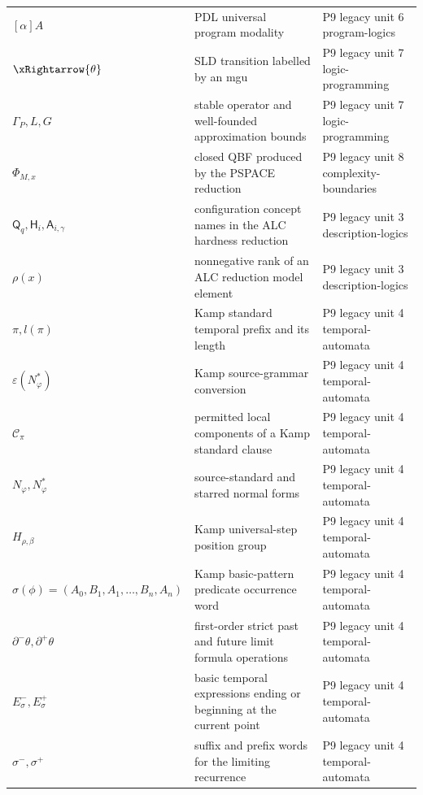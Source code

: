 \begin{longtable}{@{}p{}p{}p{}@{}}
\([\alpha]A\) & PDL universal program modality & P9 legacy unit 6 program-\allowbreak{}logics \\
\(\xRightarrow{\theta}\) & SLD transition labelled by an mgu & P9 legacy unit 7 logic-\allowbreak{}programming \\
\(\Gamma_P,\allowbreak L,\allowbreak G\) & stable operator and well-founded approximation bounds & P9 legacy unit 7 logic-\allowbreak{}programming \\
\(\Phi_{M,x}\) & closed QBF produced by the PSPACE reduction & P9 legacy unit 8 complexity-\allowbreak{}boundaries \\
\(\mathsf Q_q,\allowbreak \mathsf H_i,\allowbreak \mathsf A_{i,\gamma}\) & configuration concept names in the ALC hardness reduction & P9 legacy unit 3 description-\allowbreak{}logics \\
\(\rho(x)\) & nonnegative rank of an ALC reduction model element & P9 legacy unit 3 description-\allowbreak{}logics \\
\(\pi,\allowbreak l(\pi)\) & Kamp standard temporal prefix and its length & P9 legacy unit 4 temporal-\allowbreak{}automata \\
\(\varepsilon(N^*_{\varphi})\) & Kamp source-grammar conversion & P9 legacy unit 4 temporal-\allowbreak{}automata \\
\(\mathcal C_\pi\) & permitted local components of a Kamp standard clause & P9 legacy unit 4 temporal-\allowbreak{}automata \\
\(N_\varphi,\allowbreak N^*_{\varphi}\) & source-standard and starred normal forms & P9 legacy unit 4 temporal-\allowbreak{}automata \\
\(H_{\rho,\beta}\) & Kamp universal-step position group & P9 legacy unit 4 temporal-\allowbreak{}automata \\
\(\sigma(\phi)=(A_0,\allowbreak B_1,\allowbreak A_1,\allowbreak \ldots,\allowbreak B_n,\allowbreak A_n)\) & Kamp basic-pattern predicate occurrence word & P9 legacy unit 4 temporal-\allowbreak{}automata \\
\(\partial^-\theta,\allowbreak \partial^+\theta\) & first-order strict past and future limit formula operations & P9 legacy unit 4 temporal-\allowbreak{}automata \\
\(E^-_\sigma,\allowbreak E^+_\sigma\) & basic temporal expressions ending or beginning at the current point & P9 legacy unit 4 temporal-\allowbreak{}automata \\
\(\sigma^-,\allowbreak \sigma^+\) & suffix and prefix words for the limiting recurrence & P9 legacy unit 4 temporal-\allowbreak{}automata \\

\end{longtable}
